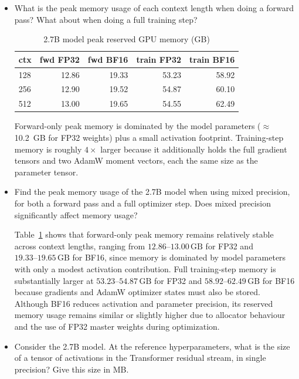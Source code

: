 \documentclass[letterpaper]{article}
\begin{document}
\begin{itemize}
		\item[(b)] What is the peak memory usage of each context length when doing a forward pass? What about when doing a full training step?
		
		\begin{table}[H]
			\centering
			\caption{2.7B model peak reserved GPU memory (GB)}
			\label{tab:peak-mem}
			\begin{tabular}{lrrrr}
				\hline
				ctx & fwd FP32 & fwd BF16 & train FP32 & train BF16 \\
				\hline
				128 & 12.86 & 19.33 & 53.23 & 58.92 \\
				256 & 12.90 & 19.52 & 54.87 & 60.10 \\
				512 & 13.00 & 19.65 & 54.55 & 62.49 \\
				\hline
			\end{tabular}
		\end{table}
		
		Forward-only peak memory is dominated by the model parameters ($\approx$10.2~GB for FP32 weights) plus a small activation footprint. Training-step memory is roughly $4\times$ larger because it additionally holds the full gradient tensors and two AdamW moment vectors, each the same size as the parameter tensor.
		
		\item[(c)] Find the peak memory usage of the 2.7B model when using mixed precision, for both a forward pass and a full optimizer step. Does mixed precision significantly affect memory usage?
		
		Table~\ref{tab:peak-mem} shows that forward-only peak memory remains relatively stable across context lengths, ranging from \(12.86\text{--}13.00\,\mathrm{GB}\) for FP32 and \(19.33\text{--}19.65\,\mathrm{GB}\) for BF16, since memory is dominated by model parameters with only a modest activation contribution. Full training-step memory is substantially larger at \(53.23\text{--}54.87\,\mathrm{GB}\) for FP32 and \(58.92\text{--}62.49\,\mathrm{GB}\) for BF16 because gradients and AdamW optimizer states must also be stored. Although BF16 reduces activation and parameter precision, its reserved memory usage remains similar or slightly higher due to allocator behaviour and the use of FP32 master weights during optimization.
		
		\item[(d)] Consider the 2.7B model. At the reference hyperparameters, what is the size of a tensor of activations in the Transformer residual stream, in single precision? Give this size in MB.
		

\end{itemize}
\end{document}
